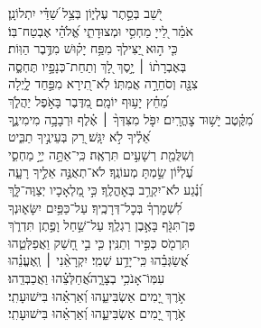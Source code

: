 \documentclass[twoside, openany, parskip=half, 11pt]{book}
\begin{document}
\begin{narrow}
יֹ֭שֵׁב בְּסֵ֣תֶר עֶלְי֑וֹן
 \hfill בְּצֵ֥ל שַׁ֝דַּ֗י יִתְלוֹנָֽן׃ \\
 אֹמַ֗ר לַ֭ייָ מַחְסִ֣י וּמְצוּדָתִ֑י \hfill אֱ֝לֹהַ֗י אֶבְטַח־בּֽוֹ׃ \\
 כִּ֤י ה֣וּא יַ֭צִּילְךָ מִפַּ֥ח יָק֗וּשׁ \hfill מִדֶּ֥בֶר הַוּֽוֹת׃ \\
 בְּאֶבְרָת֨וֹ ׀ יָ֣סֶךְ לָ֭ךְ \hfill וְתַחַת־כְּנָפָ֣יו תֶּחְסֶ֑ה\\ צִנָּ֖ה וְסֹחֵרָ֣ה אֲמִתּֽוֹ׃ \hfill
 לֹֽא־תִ֭ירָא מִפַּ֣חַד לָ֑יְלָה\\ מֵ֝חֵ֗ץ יָע֥וּף יוֹמָֽם׃ \hfill
 מִ֭דֶּבֶר בָּאֹ֣פֶל יַהֲלֹ֑ךְ \\ מִ֝קֶּ֗טֶב יָשׁ֥וּד צׇהֳרָֽיִם׃ \hfill
 יִפֹּ֤ל מִצִּדְּךָ֨ ׀ אֶ֗לֶף וּרְבָבָ֥ה מִימִינֶ֑ךָ\\ אֵ֝לֶ֗יךָ לֹ֣א יִגָּֽשׁ׃ \hfill
 רַ֭ק בְּעֵינֶ֣יךָ תַבִּ֑יט\\ וְשִׁלֻּמַ֖ת רְשָׁעִ֣ים תִּרְאֶֽה׃ \hfill
 כִּֽי־אַתָּ֣ה יְיָ֣ מַחְסִ֑י\\ עֶ֝לְי֗וֹן שַׂ֣מְתָּ מְעוֹנֶֽךָ׃ \hfill
 לֹא־תְאֻנֶּ֣ה אֵלֶ֣יךָ רָעָ֑ה\\ וְ֝נֶ֗גַע לֹא־יִקְרַ֥ב בְּאׇהֳלֶֽךָ׃ \hfill
 כִּ֣י מַ֭לְאָכָיו יְצַוֶּה־לָּ֑ךְ\\ לִ֝שְׁמׇרְךָ֗ בְּכׇל־דְּרָכֶֽיךָ׃ \hfill
 עַל־כַּפַּ֥יִם יִשָּׂא֑וּנְךָ\\ פֶּן־תִּגֹּ֖ף בָּאֶ֣בֶן רַגְלֶֽךָ׃ \hfill
 עַל־שַׁ֣חַל וָפֶ֣תֶן תִּדְרֹ֑ךְ\\ תִּרְמֹ֖ס כְּפִ֣יר וְתַנִּֽין׃ \hfill
 כִּ֤י בִ֣י חָ֭שַׁק וַאֲפַלְּטֵ֑הוּ\\ אֲ֝שַׂגְּבֵ֗הוּ כִּֽי־יָדַ֥ע שְׁמִֽי׃ \hfill
 יִקְרָאֵ֨נִי ׀ וְֽאֶעֱנֵ֗הוּ\\ עִמּֽוֹ־אָנֹכִ֥י בְצָרָ֑ה\hfill אֲ֝חַלְּצֵ֗הוּ וַאֲכַבְּדֵֽהוּ׃ \\
 אֹ֣רֶךְ יָ֭מִים אַשְׂבִּיעֵ֑הוּ \hfill וְ֝אַרְאֵ֗הוּ בִּישׁוּעָתִֽי׃ \\
\scriptsize{אֹ֣רֶךְ יָ֭מִים אַשְׂבִּיעֵ֑הוּ \hfill וְ֝אַרְאֵ֗הוּ בִּישׁוּעָתִֽי׃ \\}
\normalsize{}


\end{narrow}
\end{document}
